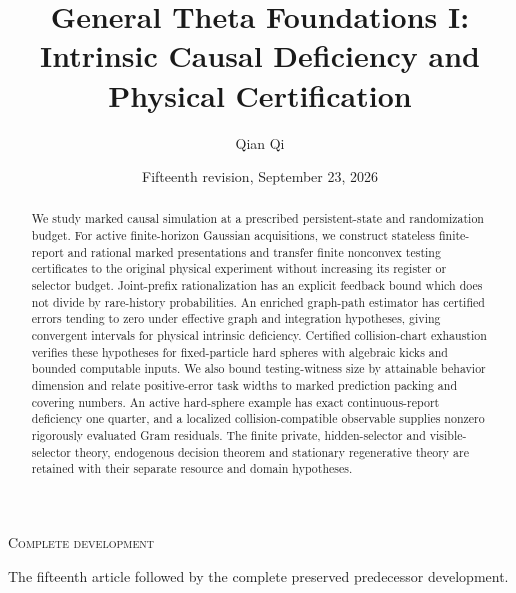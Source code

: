 
\newcommand{\Wone}{W_1}
\newcommand{\Del}{\Delta}
\newcommand{\emptyw}{\varnothing}
\newcommand{\osc}{\operatorname{osc}}
\newcommand{\diam}{\operatorname{diam}}
\newcommand{\Lipone}{\operatorname{Lip}_1}
\newcommand{\aff}{\operatorname{aff}}
\newcommand{\conv}{\operatorname{conv}}
\newcommand{\rplus}{\operatorname{rank}_{+}}
\newcommand{\dpr}{\delta^{\rm p}}
\newcommand{\dhi}{\delta^{\rm h}}
\newcommand{\dvi}{\delta^{\rm v}}
\newcommand{\dmix}{\delta^{\rm mix}}
\newcommand{\cK}{\mathcal K}
\newcommand{\cB}{\mathcal B}
\newcommand{\cI}{\mathcal I}
\title[General Theta Foundations I]{General Theta Foundations I:\\Intrinsic Causal Deficiency and Physical Certification}
\author{Qian Qi}
\date{Fifteenth revision, September 23, 2026}

\begin{abstract}
We study marked causal simulation at a prescribed persistent-state and
randomization budget. For active finite-horizon Gaussian acquisitions,
we construct stateless finite-report and rational marked presentations
and transfer finite nonconvex testing certificates to the original
physical experiment without increasing its register or selector budget.
Joint-prefix rationalization has an explicit feedback bound which does
not divide by rare-history probabilities. An enriched graph-path
estimator has certified errors tending to zero under effective graph
and integration hypotheses, giving convergent intervals for physical
intrinsic deficiency. Certified collision-chart exhaustion verifies
these hypotheses for fixed-particle hard spheres with algebraic kicks
and bounded computable inputs. We also bound testing-witness size by attainable
behavior dimension and relate positive-error task widths to marked
prediction packing and covering numbers. An active hard-sphere example
has exact continuous-report deficiency one quarter, and a localized
collision-compatible observable supplies nonzero rigorously evaluated
Gram residuals. The finite private, hidden-selector and visible-selector
theory, endogenous decision theorem and stationary regenerative theory
are retained with their separate resource and domain hypotheses.
\end{abstract}
\maketitle
\enlargethispage{4pt}
\ifcomplete
\begin{center}\small\textsc{Complete development}\par
The fifteenth article followed by the complete preserved predecessor development.
\end{center}
\fi
\tableofcontents
